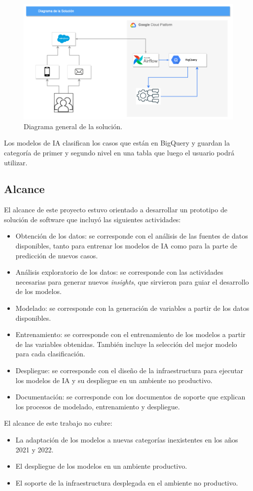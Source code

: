\begin{figure}[htbp]
	\centering
	\includegraphics[width=.8\textwidth]{./Figures/solucion1.png}
	\caption{Diagrama general de la solución.}
	\label{fig:diag1}
\end{figure}

Los modelos de IA clasifican los casos que están en BigQuery y guardan la categoría de primer y segundo nivel en una tabla que luego el usuario podrá utilizar.

\subsection{Alcance}

El alcance de este proyecto estuvo orientado a desarrollar un prototipo de solución de software que incluyó las siguientes actividades:
\begin{itemize}
\item Obtención de los datos: se corresponde con el análisis de las fuentes de datos disponibles, tanto para entrenar los modelos de IA como para la parte de predicción de nuevos casos.
\item Análisis exploratorio de los datos: se corresponde con las actividades necesarias para generar nuevos \textit{insights}, que sirvieron para guiar el desarrollo de los modelos.
\item Modelado: se corresponde con la generación de variables a partir de los datos disponibles.
\item Entrenamiento: se corresponde con el entrenamiento de los modelos a partir de las variables obtenidas. También incluye la selección del mejor modelo para cada clasificación.
\item Despliegue: se corresponde con el diseño de la infraestructura para ejecutar los modelos de IA y su despliegue en un ambiente no productivo.
\item Documentación: se corresponde con los documentos de soporte que explican los procesos de modelado, entrenamiento y despliegue.
\end{itemize}

El alcance de este trabajo no cubre:
\begin{itemize}
\item La adaptación de los modelos a nuevas categorías inexistentes en los años 2021 y 2022.
\item El despliegue de los modelos en un ambiente productivo.
\item El soporte de la infraestructura desplegada en el ambiente no productivo.
\end{itemize}